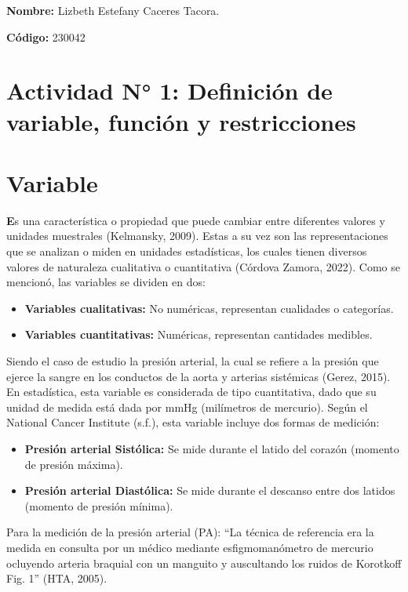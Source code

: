 \documentclass[a4paper,10pt]{article}
\begin{document}
\textbf{Nombre:} Lizbeth Estefany Caceres Tacora.

\textbf{Código:} 230042
\section*{Actividad N° 1: Definición de variable, función y restricciones}
\section*{Variable}

\textbf Es una característica o propiedad que puede cambiar entre diferentes valores y unidades muestrales (Kelmansky, 2009). Estas a su vez son las representaciones que se analizan o miden en unidades estadísticas, los cuales tienen diversos valores de naturaleza cualitativa o cuantitativa (Córdova Zamora, 2022). Como se mencionó, las variables se dividen en dos:

\begin{itemize}
    \item \textbf{Variables cualitativas:} No numéricas, representan cualidades o categorías.
    \item \textbf{Variables cuantitativas:} Numéricas, representan cantidades medibles.
\end{itemize}

Siendo el caso de estudio la presión arterial, la cual se refiere a la presión que ejerce la sangre en los conductos de la aorta y arterias sistémicas (Gerez, 2015). En estadística, esta variable es considerada de tipo cuantitativa, dado que su unidad de medida está dada por mmHg (milímetros de mercurio). Según el National Cancer Institute (s.f.), esta variable incluye dos formas de medición:

\begin{itemize}
    \item \textbf{Presión arterial Sistólica:} Se mide durante el latido del corazón (momento de presión máxima).
    \item \textbf{Presión arterial Diastólica:} Se mide durante el descanso entre dos latidos (momento de presión mínima).
\end{itemize}

Para la medición de la presión arterial (PA): ``La técnica de referencia era la medida en consulta por un médico mediante esfigmomanómetro de mercurio ocluyendo arteria braquial con un manguito y auscultando los ruidos de Korotkoff Fig. 1'' (HTA, 2005).
\end{document}

